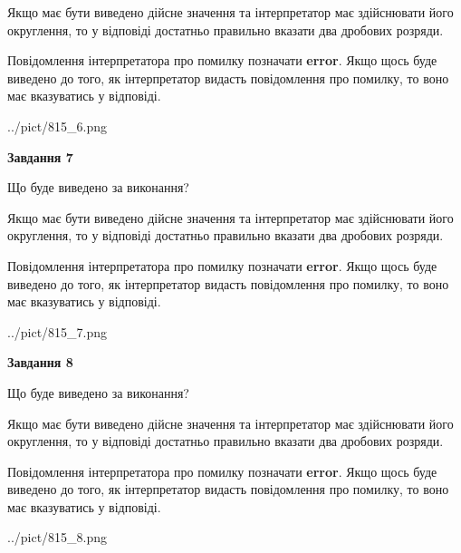 \documentclass[12pt, ukrainian]{article}
\begin{document}
{\begin {Large}
Якщо має бути виведено дійсне значення та інтерпретатор має здійснювати його округлення, 
то у відповіді достатньо правильно вказати два дробових розряди.

Повідомлення інтерпретатора про помилку позначати \textbf{error}.
Якщо щось буде виведено до того, як інтерпретатор видасть повідомлення про помилку, 
то воно має вказуватись у відповіді. \par

\begin{center}
	{../pict/815_6.png}
\end{center}
\newpage

{\begin {center}\textbf{Завдання 7}\end {center}}\par
Що буде виведено за виконання? \par

Якщо має бути виведено дійсне значення та інтерпретатор має здійснювати його округлення, 
то у відповіді достатньо правильно вказати два дробових розряди.

Повідомлення інтерпретатора про помилку позначати \textbf{error}.
Якщо щось буде виведено до того, як інтерпретатор видасть повідомлення про помилку, 
то воно має вказуватись у відповіді. \par

\begin{center}
	{../pict/815_7.png}
\end{center}
\newpage

{\begin {center}\textbf{Завдання 8}\end {center}}\par
Що буде виведено за виконання? \par

Якщо має бути виведено дійсне значення та інтерпретатор має здійснювати його округлення, 
то у відповіді достатньо правильно вказати два дробових розряди.

Повідомлення інтерпретатора про помилку позначати \textbf{error}.
Якщо щось буде виведено до того, як інтерпретатор видасть повідомлення про помилку, 
то воно має вказуватись у відповіді. \par

\begin{center}
	{../pict/815_8.png}
\end{center}
\newpage


\end{Large}}
\end{document}
